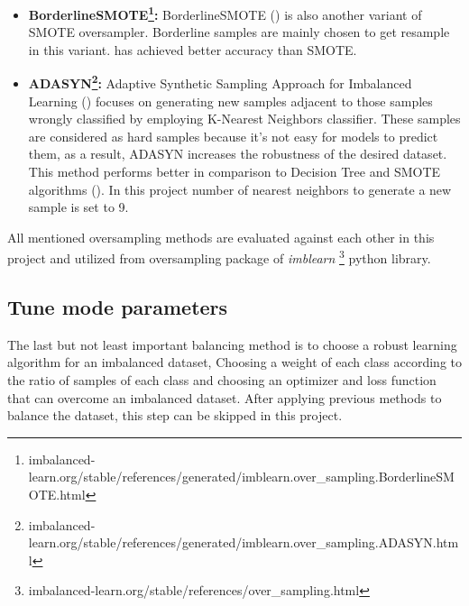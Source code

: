 \begin{itemize}
	\item \textbf{BorderlineSMOTE\footnote{imbalanced-learn.org/stable/references/generated/imblearn.over\_sampling.BorderlineSMOTE.html}:} 
	BorderlineSMOTE (\cite{borderlinesmothe}) is also another variant of SMOTE oversampler. Borderline samples are mainly chosen to get resample in this variant. \cite{borderlinesmothe} has achieved better accuracy than SMOTE.
	\item \textbf{ADASYN\footnote{imbalanced-learn.org/stable/references/generated/imblearn.over\_sampling.ADASYN.html}:} 
	Adaptive Synthetic Sampling Approach for Imbalanced Learning (\cite{adasyn}) focuses on generating new samples adjacent to those samples wrongly classified by employing K-Nearest Neighbors classifier. These samples are considered as hard samples because it's not easy for models to predict them, as a result, ADASYN increases the robustness of the desired dataset. This method performs better in comparison to Decision Tree and SMOTE algorithms (\cite{adasyn}). In this project number of nearest neighbors to generate a new sample is set to 9.
	
\end{itemize}
All mentioned oversampling methods are evaluated against each other in this project and utilized from oversampling package of \textit{imblearn} \footnote{imbalanced-learn.org/stable/references/over\_sampling.html} python library. 

\subsection{Tune mode parameters}
 The last but not least important balancing method is to choose a robust learning algorithm for an imbalanced dataset, Choosing a weight of each class according to the ratio of samples of each class and choosing an optimizer and loss function that can overcome an imbalanced dataset. After applying previous methods to balance the dataset, this step can be skipped in this project. 




